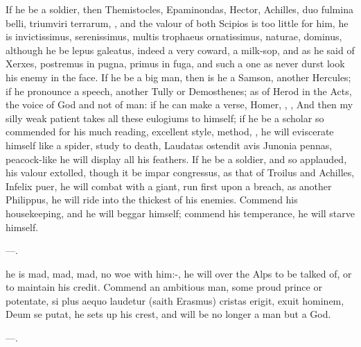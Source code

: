 {{If he be a soldier, then Themistocles, Epaminondas, Hector, Achilles,
duo fulmina belli, triumviri terrarum, \etc{}, and the valour of both
Scipios is too little for him, he is invictissimus, serenissimus,
multis trophaeus ornatissimus, naturae, dominus, although he be lepus
galeatus, indeed a very coward, a milk-sop, and as he said of
Xerxes, postremus in pugna, primus in fuga, and such a one as never
durst look his enemy in the face. If he be a big man, then is he a
Samson, another Hercules; if he pronounce a speech, another Tully or
Demosthenes; as of Herod in the Acts, the voice of God and not of man:
if he can make a verse, Homer, \Virgil{}, \etc{}, And then my silly weak
patient takes all these eulogiums to himself; if he be a scholar so
commended for his much reading, excellent style, method, \etc{}, he will
eviscerate himself like a spider, study to death, Laudatas ostendit
avis Junonia pennas, peacock-like he will display all his feathers. If
he be a soldier, and so applauded, his valour extolled, though it be
impar congressus, as that of Troilus and Achilles, Infelix puer, he
will combat with a giant, run first upon a breach, as another
Philippus, he will ride into the thickest of his enemies. Commend
his housekeeping, and he will beggar himself; commend his temperance,
he will starve himself.

---.

he is mad, mad, mad, no woe with him:-, he will
over the Alps to be talked of, or to maintain his credit. Commend
an ambitious man, some proud prince or potentate, si plus aequo
lau\-de\-tur (saith Erasmus) cristas erigit, exuit hominem, Deum se
putat, he sets up his crest, and will be no longer a man but a God.

---.

}}
